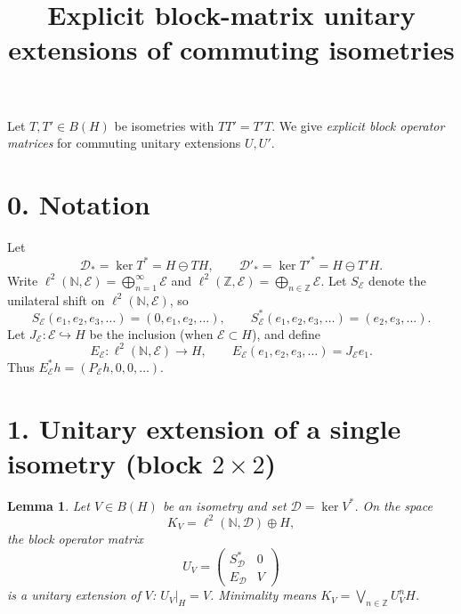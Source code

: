\documentclass[11pt]{article}
\title{Explicit block-matrix unitary extensions of commuting isometries}
\author{}
\date{}
\newtheorem{lemma}[theorem]{Lemma}
\begin{document}
\maketitle

\noindent
Let \(T,T'\in B(H)\) be isometries with \(TT'=T'T\).
We give \emph{explicit block operator matrices} for commuting unitary extensions \(U,U'\).

\bigskip
\section*{0. Notation}
Let
\[
\mathcal{D}_*=\ker T^*=H\ominus TH,\qquad
\mathcal{D}'_*=\ker{T'}^*=H\ominus T'H.
\]
Write \(\ell^2(\mathbb{N},\mathcal{E})=\bigoplus_{n=1}^\infty\mathcal{E}\) and
\(\ell^2(\mathbb{Z},\mathcal{E})=\bigoplus_{n\in\mathbb{Z}}\mathcal{E}\).
Let \(S_{\mathcal{E}}\) denote the unilateral shift on \(\ell^2(\mathbb{N},\mathcal{E})\), so
\[
S_{\mathcal{E}}(e_1,e_2,e_3,\dots)=(0,e_1,e_2,\dots),\qquad
S_{\mathcal{E}}^*(e_1,e_2,e_3,\dots)=(e_2,e_3,\dots).
\]
Let \(J_{\mathcal{E}}:\mathcal{E}\hookrightarrow H\) be the inclusion (when \(\mathcal{E}\subset H\)), and define
\[
E_{\mathcal{E}}:\ell^2(\mathbb{N},\mathcal{E})\to H,\qquad
E_{\mathcal{E}}(e_1,e_2,e_3,\dots)=J_{\mathcal{E}}e_1.
\]
Thus \(E_{\mathcal{E}}^*h=(P_{\mathcal{E}}h,0,0,\dots)\).

\bigskip
\section*{1. Unitary extension of a single isometry (block \(2\times 2\))}

\begin{lemma}
Let \(V\in B(H)\) be an isometry and set \(\mathcal{D}=\ker V^*\).
On the space
\[
K_V=\ell^2(\mathbb{N},\mathcal{D})\oplus H,
\]
the block operator matrix
\begin{equation}
\label{eq:single-U}
U_V
=
\begin{pmatrix}
S_{\mathcal{D}}^* & 0 \\
E_{\mathcal{D}} & V
\end{pmatrix}
\end{equation}
is a unitary extension of \(V\): \(U_V\big|_H=V\). Minimality means
\(K_V=\bigvee_{n\in\mathbb{Z}}U_V^n H\).
\end{lemma}
\end{document}
